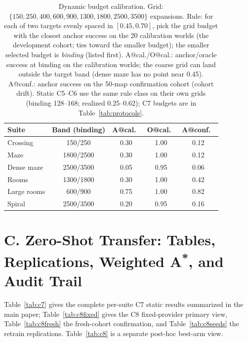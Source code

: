 \documentclass[letterpaper]{article} %
\newcommand{\stage}[1]{\textsc{#1}}
\begin{document}
\begin{table}[t]
\centering
\small
\setlength{\tabcolsep}{2.6pt}
\begin{tabular}{@{}lcccc@{}}
\toprule
Suite & Band (binding) & A@cal.\ & O@cal.\ & A@conf.\ \\
\midrule
Crossing & 150/250 & 0.30 & 1.00 & 0.12 \\
Maze & 1800/2500 & 0.30 & 1.00 & 0.12 \\
Dense maze & 2500/3500 & 0.05 & 0.95 & 0.06 \\
Rooms & 1300/1800 & 0.30 & 1.00 & 0.42 \\
Large rooms & 600/900 & 0.75 & 1.00 & 0.82 \\
Spiral & 2500/3500 & 0.20 & 0.95 & 0.16 \\
\bottomrule
\end{tabular}
\caption{Dynamic budget calibration. Grid: $\{150, 250, 400, 600, 900, 1300, 1800, 2500, 3500\}$ expansions. Rule: for each of two targets evenly spaced in $[0.45, 0.70]$, pick the grid budget with the closest anchor success on the 20 calibration worlds (the development cohort; ties toward the smaller budget); the smaller selected budget is \emph{binding} (listed first). A@cal./O@cal.: anchor/oracle success at binding on the calibration worlds; the coarse grid can land outside the target band (dense maze has no point near 0.45). A@conf.: anchor success on the 50-map confirmation cohort (cohort drift). Static \stage{C5}--\stage{C6} use the same rule class on their own grids (binding 128--168; realized 0.25--0.62); \stage{C7} budgets are in Table~\ref{tab:protocols}.}
\label{tab:calib}
\end{table}

\clearpage
\section{C. Zero-Shot Transfer: Tables, Replications, Weighted A\textsuperscript{*}, and Audit Trail}

Table~\ref{tab:c7} gives the complete per-suite \stage{C7} static results summarized in the main paper; Table~\ref{tab:c8fixed} gives the \stage{C8} fixed-provider primary view, Table~\ref{tab:c8fresh} the fresh-cohort confirmation, and Table~\ref{tab:c8seeds} the retrain replications. Table~\ref{tab:c8} is a separate post-hoc best-arm view.
\end{document}
